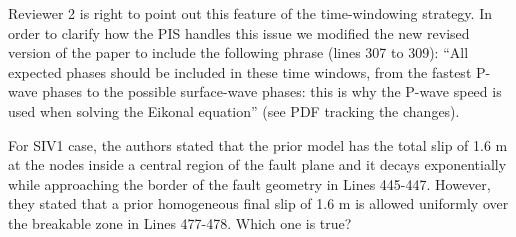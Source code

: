 \documentclass[10pt]{extarticle}
\begin{document}
\begin{Answer}
Reviewer 2 is right to point out this feature of the time-windowing strategy. 
In order to clarify how the PIS handles this issue we modified the new revised 
version of the paper to include the following phrase (lines 307 to 309): ``All 
expected phases should be included in these time windows, from the fastest P-wave 
phases to the possible surface-wave phases: this is why the P-wave speed is used 
when solving the Eikonal equation'' (see PDF tracking the changes). 
 \WorkInProgressRevTask
\end{Answer}
%
%
\begin{ReviewerComment}{2}
\noindent
 For SIV1 case, the authors stated that the prior model
 has the total slip of 1.6 m at the nodes inside a central
 region of the fault plane and it decays exponentially
 while approaching the border of the fault geometry in
 Lines 445-447. However, they stated that a prior
 homogeneous final slip of 1.6 m is allowed uniformly
 over the breakable zone in Lines 477-478. Which one is true?
\end{ReviewerComment}
%
\end{document}
